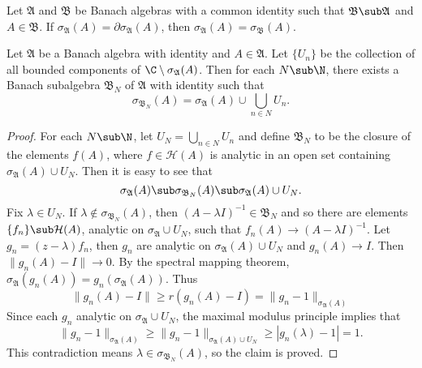 \begin{corollary}\label{Banach algebra spectrum subalgebra boundary point}
Let $\mathfrak{A}$ and $\mathfrak{B}$ be Banach algebras with a common identity such that $\mathfrak{B}\sub\mathfrak{A}$ and $A\in\mathfrak{B}$. If $\sigma_{\mathfrak{A}}(A)=\partial\sigma_{\mathfrak{A}}(A)$, then $\sigma_{\mathfrak{A}}(A)=\sigma_{\mathfrak{B}}(A)$.
\end{corollary}
\begin{proposition}\label{Banach algebra subalgebra given spectrum}
Let $\mathfrak{A}$ be a Banach algebra with identity and $A\in\mathfrak{A}$. Let $\{U_n\}$ be the collection of all bounded components of $\C\setminus\sigma_{\mathfrak{A}}(A)$. Then for each $N\sub\N$, there exists a Banach subalgebra $\mathfrak{B}_N$ of $\mathfrak{A}$ with identity such that
\[\sigma_{\mathfrak{B}_N}(A)=\sigma_{\mathfrak{A}}(A)\cup\bigcup_{n\in N}U_n.\]
\end{proposition}
\begin{proof}
For each $N\sub\N$, let $U_N=\bigcup_{n\in N}U_n$ and define $\mathfrak{B}_N$ to be the closure of the elements $f(A)$, where $f\in\mathcal{H}(A)$ is analytic in an open set containing $\sigma_{\mathfrak{A}}(A)\cup U_N$. Then it is easy to see that
\[\sigma_{\mathfrak{A}}(A)\sub\sigma_{\mathfrak{B}_N}(A)\sub\sigma_{\mathfrak{A}}(A)\cup U_N.\]
Fix $\lambda\in U_N$. If $\lambda\notin\sigma_{\mathfrak{B}_N}(A)$, then $(A-\lambda I)^{-1}\in\mathfrak{B}_N$ and so there are elements $\{f_n\}\sub\mathcal{H}(A)$, analytic on $\sigma_{\mathfrak{A}}\cup U_N$, such that $f_n(A)\to(A-\lambda I)^{-1}$. Let $g_n=(z-\lambda)f_n$, then $g_n$ are analytic on $\sigma_{\mathfrak{A}}(A)\cup U_N$ and $g_n(A)\to I$. Then $\|g_n(A)-I\|\to 0$. By the spectral mapping theorem, $\sigma_{\mathfrak{A}}(g_n(A))=g_n(\sigma_{\mathfrak{A}}(A))$. Thus
\[\|g_n(A)-I\|\geq r(g_n(A)-I)=\|g_n-1\|_{\sigma_{\mathfrak{A}}(A)}\]
Since each $g_n$ analytic on $\sigma_{\mathfrak{A}}\cup U_N$, the maximal modulus principle implies that
\[\|g_n-1\|_{\sigma_{\mathfrak{A}}(A)}\geq\|g_n-1\|_{\sigma_{\mathfrak{A}}(A)\cup U_N}\geq|g_n(\lambda)-1|=1.\]
This contradiction means $\lambda\in\sigma_{\mathfrak{B}_N}(A)$, so the claim is proved. 
\end{proof}
